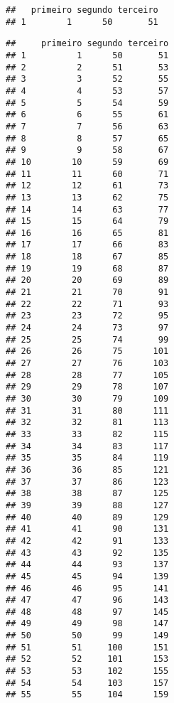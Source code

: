 \documentclass[]{article}
\newenvironment{Shaded}{\begin{snugshade}}{\end{snugshade}}
\newcommand{\CommentTok}[1]{\textcolor[rgb]{0.56,0.35,0.01}{\textit{#1}}}
\newcommand{\DecValTok}[1]{\textcolor[rgb]{0.00,0.00,0.81}{#1}}
\newcommand{\NormalTok}[1]{#1}
\newcommand{\OperatorTok}[1]{\textcolor[rgb]{0.81,0.36,0.00}{\textbf{#1}}}
\newcommand{\StringTok}[1]{\textcolor[rgb]{0.31,0.60,0.02}{#1}}
\begin{document}
\begin{verbatim}
##   primeiro segundo terceiro
## 1        1      50       51
\end{verbatim}

\begin{Shaded}
\end{Shaded}

\begin{verbatim}
##     primeiro segundo terceiro
## 1          1      50       51
## 2          2      51       53
## 3          3      52       55
## 4          4      53       57
## 5          5      54       59
## 6          6      55       61
## 7          7      56       63
## 8          8      57       65
## 9          9      58       67
## 10        10      59       69
## 11        11      60       71
## 12        12      61       73
## 13        13      62       75
## 14        14      63       77
## 15        15      64       79
## 16        16      65       81
## 17        17      66       83
## 18        18      67       85
## 19        19      68       87
## 20        20      69       89
## 21        21      70       91
## 22        22      71       93
## 23        23      72       95
## 24        24      73       97
## 25        25      74       99
## 26        26      75      101
## 27        27      76      103
## 28        28      77      105
## 29        29      78      107
## 30        30      79      109
## 31        31      80      111
## 32        32      81      113
## 33        33      82      115
## 34        34      83      117
## 35        35      84      119
## 36        36      85      121
## 37        37      86      123
## 38        38      87      125
## 39        39      88      127
## 40        40      89      129
## 41        41      90      131
## 42        42      91      133
## 43        43      92      135
## 44        44      93      137
## 45        45      94      139
## 46        46      95      141
## 47        47      96      143
## 48        48      97      145
## 49        49      98      147
## 50        50      99      149
## 51        51     100      151
## 52        52     101      153
## 53        53     102      155
## 54        54     103      157
## 55        55     104      159

\end{verbatim}
\end{document}
